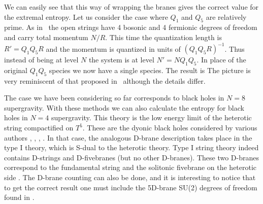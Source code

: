 We can easily see that this way of wrapping 
the branes  gives the correct value for the extremal
entropy. Let us consider the case where
$Q_1$ and
$Q_5$ are  relatively prime. As in \cama\ the open strings have 4 bosonic
and 4 fermionic degrees of freedom and carry total
momentum $N/R$. This time the quantization length is
$R'=Q_1Q_5R$ and the momentum is quantized in
units of $(Q_1 Q_5 R)^{-1}$. Thus instead of being at level
$N$ the system is at level $N'=NQ_1Q_5$. In place of the original
$Q_1Q_5$
species we now have a single species. 
The result is
\eqn{}
 The picture is  very reminiscent of
that proposed in \larsen\
although the details differ.

The case we have been considering so far corresponds to 
black holes in $N=8$ supergravity. With these methods 
we can also calculate the entropy for black holes
in $N=4$ supergravity. This theory is the low energy 
limit of the heterotic string compactified on 
$T^5$.
These are the dyonic black holes considered by
various authors %
\larsen , \tseytlin , \tseylinother , \cvyo .
In that case, the analogous D-brane description takes place
in the type I theory, which is S-dual to the heterotic theory.
Type I string  theory indeed 
contains D-strings and D-fivebranes (but no other D-branes). 
These two D-branes correspond to the fundamental string and 
the solitonic fivebrane on the heterotic side \wittenpol .
 The D-brane counting can also
be done, and it is interesting to notice that to get the
correct result one must include the 5D-brane SU(2) degrees
of freedom found in \wittensmall .


